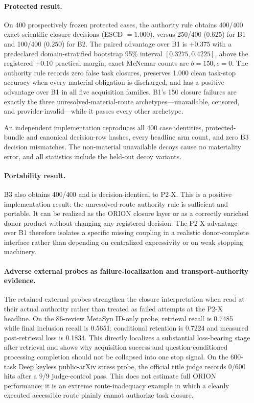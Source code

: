 \paragraph{Protected result.}
On 400 prospectively frozen protected cases, the authority rule obtains 400/400 exact scientific closure decisions (ESCD $=1.000$), versus 250/400 ($0.625$) for B1 and 100/400 ($0.250$) for B2. The paired advantage over B1 is $+0.375$ with a predeclared domain-stratified bootstrap 95\% interval $[0.3275,0.4225]$, above the registered $+0.10$ practical margin; exact McNemar counts are $b=150,c=0$. The authority rule records zero false task closures, preserves 1.000 clean task-stop accuracy when every material obligation is discharged, and has a positive advantage over B1 in all five acquisition families. B1's 150 closure failures are exactly the three unresolved-material-route archetypes---unavailable, censored, and provider-invalid---while it passes every other archetype.

An independent implementation reproduces all 400 case identities, protected-bundle and canonical decision-row hashes, every headline arm count, and zero B3 decision mismatches. The non-material unavailable decoys cause no materiality error, and all statistics include the held-out decoy variants.

\paragraph{Portability result.}
B3 also obtains 400/400 and is decision-identical to P2-X. This is a positive implementation result: the unresolved-route authority rule is sufficient and portable. It can be realized as the ORION closure layer or as a correctly enriched donor product without changing any registered decision. The P2-X advantage over B1 therefore isolates a specific missing coupling in a realistic donor-complete interface rather than depending on centralized expressivity or on weak stopping machinery.

\paragraph{Adverse external probes as failure-localization and transport-authority evidence.}
The retained external probes strengthen the closure interpretation when read at their actual authority rather than treated as failed attempts at the P2-X headline. On the 86-review MetaSyn ID-only probe, retrieval recall is 0.7485 while final inclusion recall is 0.5651; conditional retention is 0.7224 and measured post-retrieval loss is 0.1834. This directly localizes a substantial loss-bearing stage after retrieval and shows why acquisition success and question-conditioned processing completion should not be collapsed into one stop signal. On the 600-task Deep keyless public-arXiv stress probe, the official title judge records 0/600 hits after a 9/9 judge-control pass. This does not estimate full ORION performance; it is an extreme route-inadequacy example in which a cleanly executed accessible route plainly cannot authorize task closure.

